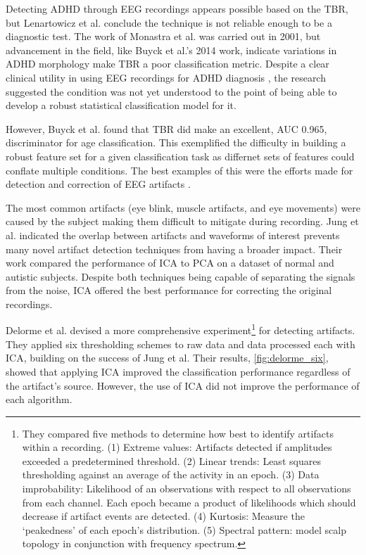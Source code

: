 Detecting \ac{ADHD} through \ac{EEG} recordings appears possible based on the \ac{TBR}, but Lenartowicz et al. conclude the technique is not reliable enough to be a diagnostic test. The work of Monastra et al. was carried out in 2001, but advancement in the field, like Buyck et al.'s 2014 work, indicate variations in \ac{ADHD} morphology make \ac{TBR} a poor classification metric. Despite a clear clinical utility in using \ac{EEG} recordings for \ac{ADHD} diagnosis \cite{Loo2012}, the research suggested the condition was not yet understood to the point of being able to develop a robust statistical classification model for it. 

However, Buyck et al. found that \ac{TBR} did make an excellent, AUC 0.965, discriminator for age classification. This exemplified the difficulty in building a robust feature set for a given classification task as differnet sets of features could conflate multiple conditions. The best examples of this were the efforts made for detection and correction of \ac{EEG} artifacts \cite{Nolan2010}.

The most common artifacts (eye blink, muscle artifacts, and eye movements) were caused by the subject making them difficult to mitigate during recording. Jung et al. \cite{Jung2000} indicated the overlap between artifacts and waveforms of interest prevents many novel artifact detection techniques from having a broader impact. Their work compared the performance of \ac{ICA} to \ac{PCA} on a dataset of normal and autistic subjects. Despite both techniques being capable of separating the signals from the noise, \ac{ICA} offered the best performance for correcting the original recordings.

Delorme et al. \cite{Delorme2007} devised a more comprehensive experiment\footnote{They compared five methods to determine how best to identify artifacts within a recording. (1) Extreme values: Artifacts detected if amplitudes exceeded a predetermined threshold. (2) Linear trends: Least squares thresholding against an average of the activity in an epoch. (3) Data improbability: Likelihood of an observations with respect to all observations from each channel. Each epoch became a product of likelihoods which should decrease if artifact events are detected. (4) Kurtosis: Measure the `peakedness' of each epoch's distribution. (5) Spectral pattern: model scalp topology in conjunction with frequency spectrum.} for detecting artifacts. They applied six thresholding schemes to raw data and data processed each with \ac{ICA}, building on the success of Jung et al. Their results, \cref{fig:delorme_six}, showed that applying \ac{ICA} improved the classification performance regardless of the artifact's source. However, the use of \ac{ICA} did not improve the performance of each algorithm.

